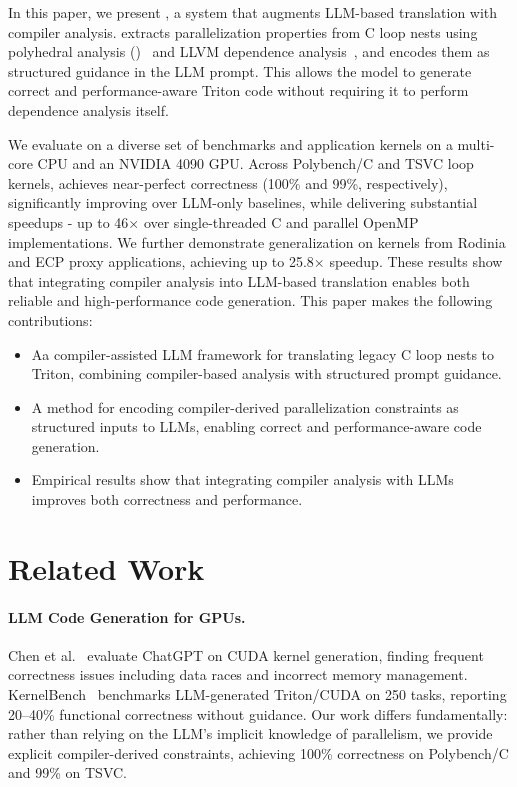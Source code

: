 \documentclass[sigconf]{acmart}
\begin{document}
In this paper, we present \sysname, a system that augments LLM-based translation with compiler analysis. \sysname extracts parallelization properties from C loop nests using polyhedral analysis (\pet)~\cite{verdoolaege2012polyhedral} and LLVM dependence analysis~\cite{llvm}, and encodes them as structured guidance in the LLM prompt. This allows the model to generate correct and performance-aware Triton code without requiring it to perform dependence analysis itself. 

We evaluate \sysname on a diverse set of benchmarks and application kernels on a multi-core CPU and an NVIDIA 4090 GPU. Across Polybench/C and TSVC loop kernels, \sysname achieves near-perfect correctness (100\% and 99\%, respectively), significantly improving over LLM-only baselines, while delivering substantial speedups - up to 46$\times$ over single-threaded C and parallel OpenMP implementations. We further demonstrate generalization on kernels from Rodinia and ECP proxy applications, achieving up to 25.8$\times$ speedup. These results show that integrating compiler analysis into LLM-based translation enables both reliable and high-performance code generation. This paper makes the following contributions:

\begin{itemize}
\item Aa compiler-assisted LLM framework for translating legacy C loop nests to Triton, combining compiler-based analysis with structured prompt guidance.
\item A method for encoding compiler-derived parallelization constraints as structured inputs to LLMs, enabling correct and performance-aware code generation.
\item Empirical results show that integrating compiler analysis with LLMs improves both correctness and performance.
\end{itemize}







\section{Related Work}
\label{sec:related}

\paragraph{LLM Code Generation for GPUs.}
Chen et al.~\cite{chen2024chatgpt} evaluate ChatGPT on CUDA kernel
generation, finding frequent correctness issues including data races and
incorrect memory management.
KernelBench~\cite{ouyang2024kernelbench} benchmarks LLM-generated
Triton/CUDA on 250 tasks, reporting 20--40\% functional correctness
without guidance.  Our work differs fundamentally: rather than relying
on the LLM's implicit knowledge of parallelism, we provide explicit
compiler-derived constraints, achieving 100\% correctness on
Polybench/C and 99\% on TSVC.
\end{document}
